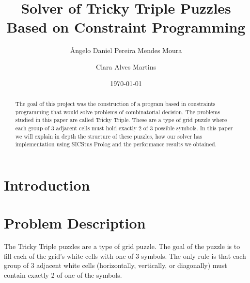 \documentclass[runningheads]{llncs}
\begin{document}
\title{Solver of Tricky Triple Puzzles Based on Constraint Programming}

\author{Ângelo Daniel Pereira Mendes Moura \\
\and Clara Alves Martins}


\date{\today}

\maketitle              %

\begin{abstract}
The goal of this project was the construction of a program based in constraints programming that would solve problems of combinatorial decision.
The problems studied in this paper are called Tricky Triple. These are a type of grid puzzle where each group of 3 adjacent cells must hold exactly 2 of 3 possible symbols.
In this paper we will explain in depth the structure of these puzzles, how our solver has implementation using SICStus Prolog and the performance results we obtained.    

\end{abstract}

\newpage

\setcounter{tocdepth}{2} %
\doublespacing %
\tableofcontents
\singlespacing

\newpage

\section{Introduction}

\section{Problem Description}
The Tricky Triple puzzles are a type of grid puzzle. The goal of the puzzle is to fill each of the grid’s white cells with one of 3 symbols. The only rule is that each group of 3 adjacent white cells (horizontally, vertically, or diagonally) must contain exactly 2 of one of the symbols.
\end{document}
